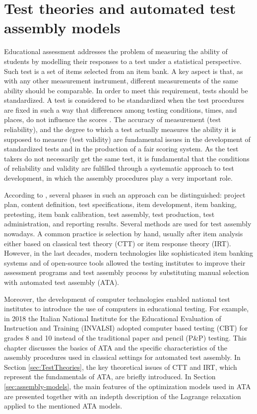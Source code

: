 \chapter{Test theories and automated test assembly models}
\label{ch:ATA}

Educational assessment addresses the problem of measuring the ability of students by modelling their responses to a test under a statistical perspective.
Such test is a set of items selected from an item bank.
A key aspect is that, as with any other measurement instrument, different measurements of the same ability should be comparable. In order to meet this requirement, tests should be standardized.
A test is considered to be standardized when the test procedures are fixed in such a way that differences among testing conditions, times, and places, do not influence the scores \parencite{verschoor2007genetic}.
The accuracy of measurement (test reliability), and the degree to which a test actually measures the ability it is supposed to measure (test validity) are fundamental issues in the development of standardized tests and in the production of a fair scoring system.
As the test takers do not necessarily get the same test, it is fundamental that the conditions of reliability and validity are fulfilled through a systematic approach to test development, in which the assembly procedures play a very important role.

According to \textcite{downing2006twelve}, several phases in such an approach can be distinguished: project plan, content definition, test specifications, item development, item banking, pretesting, item bank calibration, test assembly, test production, test administration, and reporting results.
Several methods are used for test assembly nowadays. A common practice is selection by hand, usually after item analysis either based on classical test theory (CTT) or item response theory (IRT). However, in the last decades, modern technologies like sophisticated item banking systems and of open-source tools allowed the testing institutes to improve their assessment programs and test assembly process by substituting manual selection with automated test assembly (ATA). 

Moreover, the development of computer technologies enabled national test institutes to introduce the use of computers in educational testing. For example, in 2018 the Italian National Institute for the Educational Evaluation of Instruction and Training (INVALSI) adopted computer based testing (CBT) for grades 8 and 10 instead of the traditional paper and pencil (P\&P) testing. This chapter discusses the basics of ATA and the specific characteristics of the assembly procedures used in classical settings for automated test assembly. In Section \ref{sec:TestTheories}, the key theoretical issues of CTT and IRT, which represent the fundamentals of ATA, are briefly introduced. In Section \ref{sec:assembly-models}, the main features of the optimization models used in ATA are presented together with an indepth description of the Lagrange relaxation \parencite{fisher1981lagrangian} applied to the mentioned ATA models.



